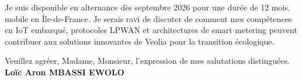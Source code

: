 \documentclass[a4paper,11pt]{article}
\begin{document}
\vspace{0.8em}\noindent Je suis disponible en alternance d\`es septembre 2026 pour une dur\'ee de 12 mois, mobile en Île-de-France. Je serais ravi de discuter de comment mes comp\'etences en IoT embarqu\'e, protocoles LPWAN et architectures de smart metering peuvent contribuer aux solutions innovantes de Veolia pour la transition \'ecologique.

\vspace{1.5em}\noindent Veuillez agr\'eer, Madame, Monsieur, l'expression de mes salutations distingu\'ees.
\vspace{2em}\noindent \textbf{Lo\"ic Aron MBASSI EWOLO}
\end{document}
